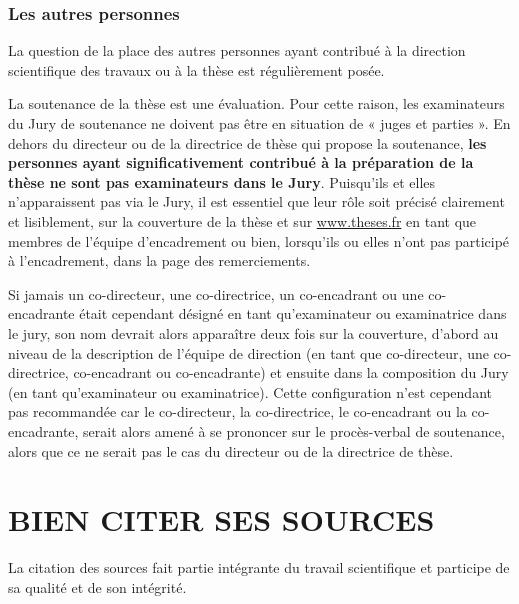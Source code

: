 \documentclass[french,12pt,a4paper]{book}
\begin{document}
\subsection{Les autres personnes}
La question de la place des autres personnes ayant contribué à la direction scientifique des travaux ou à la thèse est régulièrement posée.\\ \par
La soutenance de la thèse est une évaluation. Pour cette raison, les examinateurs du Jury de soutenance ne doivent pas être en situation de « juges et parties ». En dehors du directeur ou de la directrice de thèse qui propose la soutenance, \textbf{les personnes ayant significativement contribué à la préparation de la thèse ne sont pas examinateurs dans le Jury}. Puisqu’ils et elles n’apparaissent pas via le Jury, il est essentiel que leur rôle soit précisé clairement et lisiblement, sur la couverture de la thèse et sur \url{www.theses.fr} en tant que membres de l’équipe d’encadrement ou bien,  lorsqu’ils ou elles n’ont pas participé à l’encadrement, dans la page des remerciements.\\ \par
Si jamais un co-directeur, une co-directrice, un co-encadrant ou une co-encadrante était cependant désigné en tant qu’examinateur ou examinatrice dans le jury, son nom devrait alors apparaître deux fois sur la couverture, d’abord au niveau de la description de l’équipe de direction (en tant que co-directeur, une co-directrice, co-encadrant ou co-encadrante) et ensuite dans la composition du Jury (en tant qu’examinateur ou examinatrice). Cette configuration n’est cependant pas recommandée car le co-directeur, la co-directrice, le co-encadrant ou la co-encadrante, serait alors amené à se prononcer sur le procès-verbal de soutenance, alors que ce ne serait pas le cas du directeur ou de la directrice de thèse.

\chapter{BIEN CITER SES SOURCES}
La citation des sources fait partie intégrante du travail scientifique et participe de sa qualité et de son intégrité.
\end{document}
